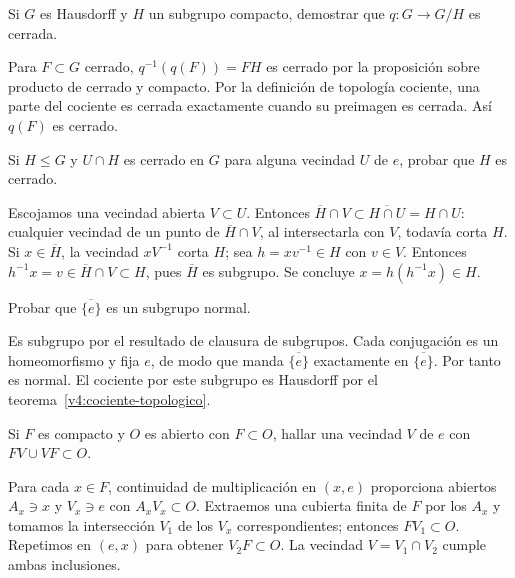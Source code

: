 \begin{ejercicio}\label{ej:v4-l16-5}
Si $G$ es Hausdorff y $H$ un subgrupo compacto, demostrar que $q:G\to G/H$ es cerrada.
\end{ejercicio}
\begin{solucion}
Para $F\subset G$ cerrado, $q^{-1}(q(F))=FH$ es cerrado por la proposición sobre producto de cerrado y compacto. Por la definición de topología cociente, una parte del cociente es cerrada exactamente cuando su preimagen es cerrada. Así $q(F)$ es cerrado.
\end{solucion}

\begin{ejercicio}\label{ej:v4-l16-6}
Si $H\leq G$ y $U\cap H$ es cerrado en $G$ para alguna vecindad $U$ de $e$, probar que $H$ es cerrado.
\end{ejercicio}
\begin{solucion}
Escojamos una vecindad abierta $V\subset U$. Entonces $\overline H\cap V\subset\overline{H\cap U}=H\cap U$: cualquier vecindad de un punto de $\overline H\cap V$, al intersectarla con $V$, todavía corta $H$. Si $x\in\overline H$, la vecindad $xV^{-1}$ corta $H$; sea $h=xv^{-1}\in H$ con $v\in V$. Entonces $h^{-1}x=v\in\overline H\cap V\subset H$, pues $\overline H$ es subgrupo. Se concluye $x=h(h^{-1}x)\in H$.
\end{solucion}

\begin{ejercicio}\label{ej:v4-l16-7}
Probar que $\overline{\{e\}}$ es un subgrupo normal.
\end{ejercicio}
\begin{solucion}
Es subgrupo por el resultado de clausura de subgrupos. Cada conjugación es un homeomorfismo y fija $e$, de modo que manda $\overline{\{e\}}$ exactamente en $\overline{\{e\}}$. Por tanto es normal. El cociente por este subgrupo es Hausdorff por el teorema~\ref{v4:cociente-topologico}.
\end{solucion}

\begin{ejercicio}\label{ej:v4-l16-8}
Si $F$ es compacto y $O$ es abierto con $F\subset O$, hallar una vecindad $V$ de $e$ con $FV\cup VF\subset O$.
\end{ejercicio}
\begin{solucion}
Para cada $x\in F$, continuidad de multiplicación en $(x,e)$ proporciona abiertos $A_x\ni x$ y $V_x\ni e$ con $A_xV_x\subset O$. Extraemos una cubierta finita de $F$ por los $A_x$ y tomamos la intersección $V_1$ de los $V_x$ correspondientes; entonces $FV_1\subset O$. Repetimos en $(e,x)$ para obtener $V_2F\subset O$. La vecindad $V=V_1\cap V_2$ cumple ambas inclusiones.
\end{solucion}

